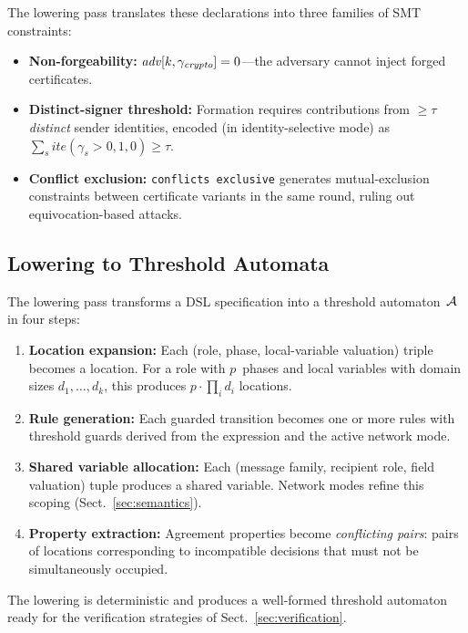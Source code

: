 The lowering pass translates these declarations into three families of
SMT constraints:
\begin{itemize}
  \item \textbf{Non-forgeability:}
    $\mathit{adv}[k, \gamma_{\mathit{crypto}}] = 0$---the adversary
    cannot inject forged certificates.
  \item \textbf{Distinct-signer threshold:}
    Formation requires contributions from $\geq\!\tau$ \emph{distinct}
    sender identities, encoded (in identity-selective mode) as
    $\sum_s \mathit{ite}(\gamma_s > 0, 1, 0) \geq \tau$.
  \item \textbf{Conflict exclusion:}
    \texttt{conflicts exclusive} generates mutual-exclusion constraints
    between certificate variants in the same round, ruling out
    equivocation-based attacks.
\end{itemize}

\subsection{Lowering to Threshold Automata}\label{sec:lowering}

The lowering pass transforms a DSL specification into a threshold
automaton~$\mathcal{A}$ in four steps:
\begin{enumerate}
  \item \textbf{Location expansion:}
    Each (role, phase, local-variable valuation) triple becomes a
    location.  For a role with $p$~phases and local variables with
    domain sizes $d_1, \ldots, d_k$, this produces
    $p \cdot \prod_i d_i$ locations.
  \item \textbf{Rule generation:}
    Each guarded transition becomes one or more rules with threshold
    guards derived from the expression and the active network mode.
  \item \textbf{Shared variable allocation:}
    Each (message family, recipient role, field valuation) tuple
    produces a shared variable.  Network modes refine this scoping
    (Sect.~\ref{sec:semantics}).
  \item \textbf{Property extraction:}
    Agreement properties become \emph{conflicting pairs}: pairs of
    locations corresponding to incompatible decisions that must not be
    simultaneously occupied.
\end{enumerate}

The lowering is deterministic and produces a well-formed threshold
automaton ready for the verification strategies of
Sect.~\ref{sec:verification}.
